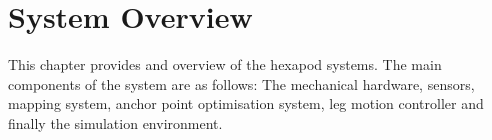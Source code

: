 \chapter{System Overview}
This chapter provides and overview of the hexapod systems.
The main components of the system are as follows: The mechanical hardware, sensors, mapping system,
anchor point optimisation system, leg motion controller and finally the simulation environment.